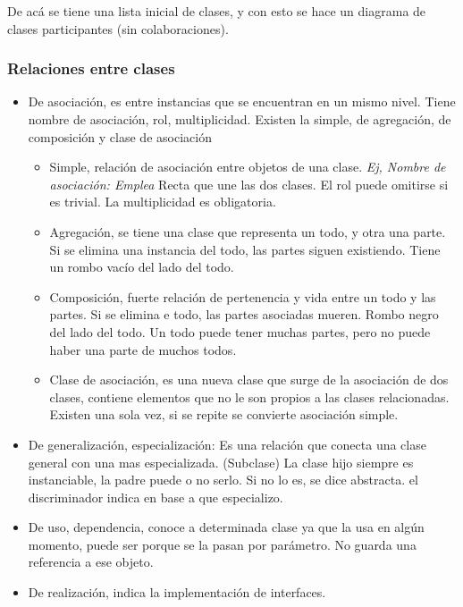 \documentclass[titlepage,a4paper]{article}
\begin{document}
De acá se tiene una lista inicial de clases, y con esto se hace un diagrama de clases participantes (sin colaboraciones).

\subsubsection*{Relaciones entre clases}
\begin{itemize}
    \item De asociación, es entre instancias que se encuentran en un mismo nivel. Tiene nombre de asociación, rol, multiplicidad. Existen la simple, de agregación, de composición y clase de asociación
    
    \begin{itemize}
        \item Simple, relación de asociación entre objetos de una clase. \textit{Ej, Nombre de asociación: Emplea} Recta que une las dos clases. El rol puede omitirse si es trivial. La multiplicidad es obligatoria.
        \item Agregación, se tiene una clase que representa un todo, y otra una parte. Si se elimina una instancia del todo, las partes siguen existiendo. Tiene un rombo vacío del lado del todo.
        \item Composición, fuerte relación de pertenencia y vida entre un todo y las partes. Si se elimina e todo, las partes asociadas mueren. Rombo negro del lado del todo. Un todo puede tener muchas partes, pero no puede haber una parte de muchos todos.
        \item Clase de asociación, es una nueva clase que surge de la asociación de dos clases, contiene elementos que no le son propios a las clases relacionadas. Existen una sola vez, si se repite se convierte asociación simple.
    \end{itemize}
    
    \item De generalización, especialización: Es una relación que conecta una clase general con una mas especializada. (Subclase) La clase hijo siempre es instanciable, la padre puede o no serlo. Si no lo es, se dice abstracta. el discriminador indica en base a que especializo.
    
    \item De uso, dependencia, conoce a determinada clase ya que la usa en algún momento, puede ser porque se la pasan por parámetro. No guarda una referencia a ese objeto.
    \item De realización, indica la implementación de interfaces.
\end{itemize}
\end{document}
